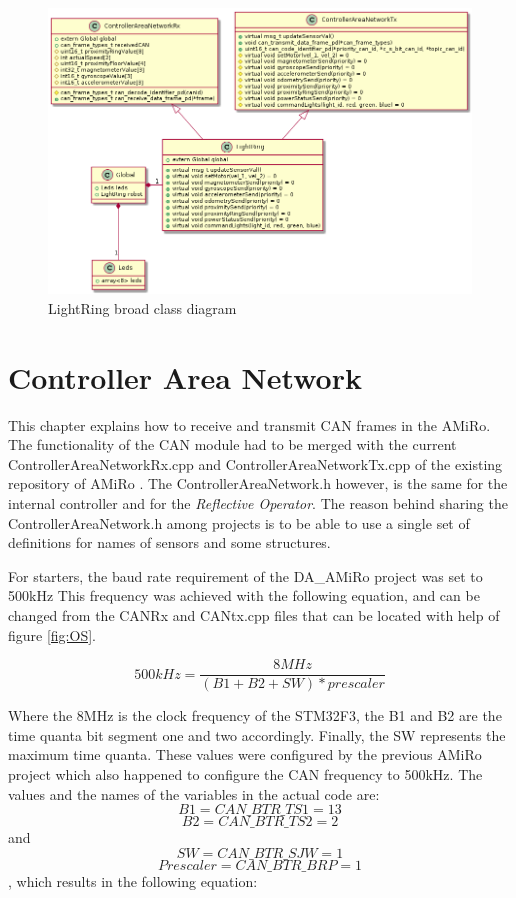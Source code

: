 \documentclass[12pt]{report}%
\begin{document}
\begin{figure}[ht]
	\centering
	\includegraphics[width=\textwidth]{LRclass}
    \caption{LightRing broad class diagram}
    \label{fig:LRclass}
\end{figure}

\chapter{Controller Area Network}
\label{chap:CAN}
This chapter explains how to receive and transmit CAN frames in the AMiRo. The functionality of the CAN module had to be merged with the current ControllerAreaNetworkRx.cpp and ControllerAreaNetworkTx.cpp of the existing repository of AMiRo \cite{AMiRo_Wiki}. The ControllerAreaNetwork.h however, is the same for the internal controller and for the \textit{Reflective Operator}. The reason behind sharing the ControllerAreaNetwork.h among projects is to be able to use a single set of definitions for names of sensors and some structures.

For starters, the baud rate requirement of the DA\_AMiRo project was set to 500kHz This frequency was achieved with the following equation, and can be changed from the CANRx and CANtx.cpp files that can be located with help of figure \ref{fig:OS}.

\begin{equation} \label{eq:baudrate1}
	500kHz= \frac{8MHz}{(B1+B2+SW)*prescaler}
\end{equation}

Where the 8MHz is the clock frequency of the STM32F3, the B1 and B2 are the time quanta bit segment one and two accordingly. Finally, the SW represents the maximum time quanta. These values were configured by the previous AMiRo project which also happened to configure the CAN frequency to 500kHz. The values and the names of the variables in the actual code are: $$B1 = CAN\_BTR\_TS1 = 13$$ $$B2 = CAN\_BTR\_TS2 = 2$$ and $$SW = CAN\_BTR\_SJW = 1$$ $$Prescaler = CAN\_BTR\_BRP = 1$$, which results in the following equation:
\end{document}
